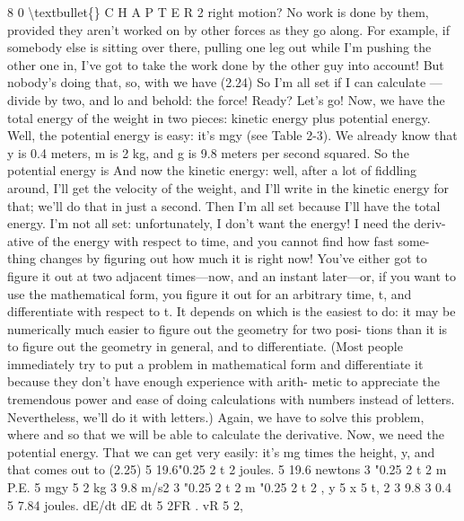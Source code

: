 \documentclass[10pt,oneside]{article}
\begin{document}
8 0 \textbackslash{}textbullet\{\} C H A P T E R  2 right motion? No work is done by them, provided they aren’t worked on by other forces as they go along. For example, if somebody else is sitting over there, pulling one leg out while I’m pushing the other one in, I’ve got to take the work done by the other guy into account! But nobody’s doing that, so, with we have (2.24) So I’m all set if I can calculate ---divide by two, and lo and behold: the force! Ready? Let’s go! Now, we have the total energy of the weight in two pieces: kinetic energy plus potential energy. Well, the potential energy is easy: it’s mgy (see Table 2-3). We already know that y is 0.4 meters, m is 2 kg, and g is 9.8 meters per second squared. So the potential energy is And now the kinetic energy: well, after a lot of fiddling around, I’ll get the velocity of the weight, and I’ll write in the kinetic energy for that; we’ll do that in just a second. Then I’m all set because I’ll have the total energy. I’m not all set: unfortunately, I don’t want the energy! I need the deriv- ative of the energy with respect to time, and you cannot find how fast some- thing changes by figuring out how much it is right now! You’ve either got to figure it out at two adjacent times---now, and an instant later---or, if you want to use the mathematical form, you figure it out for an arbitrary time, t, and differentiate with respect to t. It depends on which is the easiest to do: it may be numerically much easier to figure out the geometry for two posi- tions than it is to figure out the geometry in general, and to differentiate. (Most people immediately try to put a problem in mathematical form and differentiate it because they don’t have enough experience with arith- metic to appreciate the tremendous power and ease of doing calculations with numbers instead of letters. Nevertheless, we’ll do it with letters.) Again, we have to solve this problem, where and so that we will be able to calculate the derivative. Now, we need the potential energy. That we can get very easily: it’s mg times the height, y, and that comes out to (2.25) 5 19.6"0.25 2 t 2 joules. 5 19.6 newtons 3 "0.25 2 t 2 m P.E. 5 mgy 5 2 kg 3 9.8 m/s2 3 "0.25 2 t 2 m "0.25 2 t 2 , y 5 x 5 t, 2 3 9.8 3 0.4 5 7.84 joules. dE/dt dE dt 5 2FR . vR 5 2,\par
\end{document}

